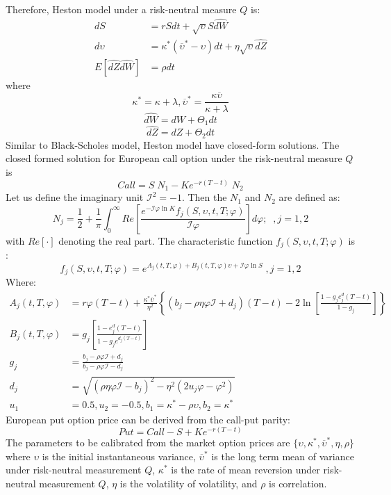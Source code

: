 \documentclass[letterpaper,12pt,titlepage,oneside,final]{book}
\numberwithin{equation}{section}
\theoremstyle{definition}
\begin{document}
Therefore, Heston model under a risk-neutral measure $Q$ is:
\begin{equation}
\begin{split}
dS&=r S dt + \sqrt{\upsilon} S \hat{dW}\\
d\upsilon&=\kappa^*(\overline{\upsilon}^*-\upsilon)dt+\eta \sqrt{\upsilon}\hat{dZ}\\
E[\hat{dZ}\hat{dW}]&=\rho dt
\end{split}
\label{eq:hestonNeutral}
\end{equation}
where
\[
\kappa^*=\kappa+\lambda, \overline{\upsilon}^*=\frac{\kappa \overline{\upsilon}}{\kappa+\lambda}
\]
\[
\hat{dW}=dW+\Theta_1 dt
\]
\[
\hat{dZ}=dZ+\Theta_2 dt
\]
Similar to Black-Scholes model, Heston model have closed-form solutions. The closed formed solution for European call option under  the risk-neutral measure $Q$ is
\begin{equation}
	\label{eq:hestonPrice}
Call=S\; N_1-Ke^{-r(T-t)} \; N_2
\end{equation}
Let us define the imaginary unit $\mathcal{I}^2=-1$. Then the $N_1$ and $N_2$ are defined as:
\[
N_j=\frac{1}{2}+\frac{1}{\pi}\int_{0}^{\infty} Re \left[\frac{e^{-\mathcal{I} \varphi \ln{K}} f_j(S,\upsilon,t,T;\varphi)} {\mathcal{I}\varphi} \right] d\varphi;\;\;, j=1,2
\] with $Re[\cdot]$ denoting the real part.
The characteristic function $f_j(S,\upsilon,t,T;\varphi)$ is :
\[
f_j(S,\upsilon,t,T;\varphi)=e^{A_j(t,T,\varphi)+B_j(t,T,\varphi)\upsilon+\mathcal{I} \varphi \ln{S}}\;, j=1,2
\]
Where:
\[
\begin{split}
A_j(t,T,\varphi)&=r \varphi (T-t)+ \frac{\kappa^* \overline{\upsilon}^*}{\eta^2}\left\{(b_j-\rho \eta \varphi \mathcal{I}+ d_j) (T-t)- 2\ln{\left[ \frac{1-g_je^d_j(T-t)}{1-g_j}\right]}     \right\}\\
B_j(t,T,\varphi)&=g_j\left[ \frac{1-e^d_j(T-t)}{1-g_je^{d_j(T-t)}}\right] \\
g_j&=\frac{b_j-\rho\varphi \mathcal{I}+d_j}{b_j-\rho\varphi \mathcal{I}-d_j}\\
d_j&=\sqrt{(\rho \eta \varphi \mathcal{I}-b_j)^2-\eta^2(2 u_j \varphi- \varphi^2)}\\
u_1&=0.5, u_2=-0.5, b_1=\kappa^*-\rho \upsilon, b_2=\kappa^*
\end{split}
\]
European put option price can be derived from the call-put parity:
\[
Put=Call-S+K e^{-r(T-t)}
\]
The parameters to be calibrated from the market option prices are $\{\upsilon,\kappa^*,\overline{\upsilon}^*,\eta,\rho\}$ where $\upsilon$ is the initial instantaneous variance, $\overline{\upsilon}^*$ is the long term mean of variance under risk-neutral measurement $Q$, $\kappa^*$ is the rate of mean reversion under risk-neutral measurement $Q$, $\eta$ is the volatility of volatility, and $\rho$ is correlation.
\end{document}
